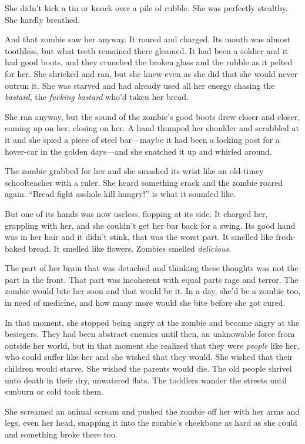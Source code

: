 She didn’t kick a tin or knock over a pile of rubble. She was
perfectly stealthy. She hardly breathed.

And that zombie saw her anyway. It roared and charged. Its mouth
was almost toothless, but what teeth remained there gleamed. It had
been a soldier and it had good boots, and they crunched the broken
glass and the rubble as it pelted for her. She shrieked and ran,
but she knew even as she did that she would never outrun it. She
was starved and had already used all her energy chasing the
\emph{bastard}, the \emph{fucking bastard} who’d taken her bread.

She ran anyway, but the sound of the zombie’s good boots drew
closer and closer, coming up on her, closing on her. A hand thumped
her shoulder and scrabbled at it and she spied a piece of steel
bar—maybe it had been a locking post for a hover-car in the golden
days—and she snatched it up and whirled around.

The zombie grabbed for her and she smashed its wrist like an
old-timey schoolteacher with a ruler. She heard something crack and
the zombie roared again. “Bread fight asshole kill hungry!” is what
it sounded like.

But one of its hands was now useless, flopping at its side. It
charged her, grappling with her, and she couldn’t get her bar back
for a swing. Its good hand was in her hair and it didn’t stink,
that was the worst part. It smelled like fresh-baked bread. It
smelled like flowers. Zombies smelled \emph{delicious}.

The part of her brain that was detached and thinking these thoughts
was not the part in the front. That part was incoherent with equal
parts rage and terror. The zombie would bite her soon and that
would be it. In a day, she’d be a zombie too, in need of medicine,
and how many more would she bite before she got cured.

In that moment, she stopped being angry at the zombie and became
angry at the besiegers. They had been abstract enemies until then,
an unknowable force from outside her world, but in that moment she
realized that they were \emph{people} like her, who could suffer
like her and she wished that they would. She wished that their
children would starve. She wished the parents would die. The old
people shrivel unto death in their dry, unwatered flats. The
toddlers wander the streets until sunburn or cold took them.

She screamed an animal scream and pushed the zombie off her with
her arms and legs, even her head, snapping it into the zombie’s
cheekbone as hard as she could and something broke there too.

